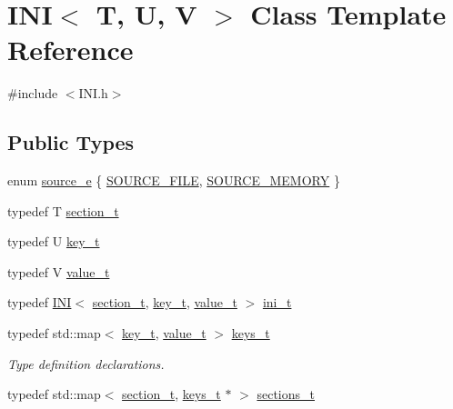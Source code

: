 \hypertarget{class_i_n_i}{}\section{I\+N\+I$<$ T, U, V $>$ Class Template Reference}
\label{class_i_n_i}


{\ttfamily \#include $<$I\+N\+I.\+h$>$}

\subsection*{Public Types}
\begin{DoxyCompactItemize}
\item 
enum \hyperlink{class_i_n_i_a0e7d70a0276fc704cdd427c9b02f7a03}{source\+\_\+e} \{ \hyperlink{class_i_n_i_a0e7d70a0276fc704cdd427c9b02f7a03a0bec937da54b19ad14ecaded8360b65f}{S\+O\+U\+R\+C\+E\+\_\+\+F\+I\+L\+E}, 
\hyperlink{class_i_n_i_a0e7d70a0276fc704cdd427c9b02f7a03aaaa209937bb226994c131a9b35fe0984}{S\+O\+U\+R\+C\+E\+\_\+\+M\+E\+M\+O\+R\+Y}
 \}
\item 
typedef T \hyperlink{class_i_n_i_a82551bff97cdd5c7ff183b24bd9b2188}{section\+\_\+t}
\item 
typedef U \hyperlink{class_i_n_i_acfa659efbac1eb0c62c1a910b0b09541}{key\+\_\+t}
\item 
typedef V \hyperlink{class_i_n_i_aeda858880798b4d54ba09bbd00ee1683}{value\+\_\+t}
\item 
typedef \hyperlink{class_i_n_i}{I\+N\+I}$<$ \hyperlink{class_i_n_i_a82551bff97cdd5c7ff183b24bd9b2188}{section\+\_\+t}, \hyperlink{class_i_n_i_acfa659efbac1eb0c62c1a910b0b09541}{key\+\_\+t}, \hyperlink{class_i_n_i_aeda858880798b4d54ba09bbd00ee1683}{value\+\_\+t} $>$ \hyperlink{class_i_n_i_a510efd26938d16fcaac1b3b8bdd47f34}{ini\+\_\+t}
\item 
typedef std\+::map$<$ \hyperlink{class_i_n_i_acfa659efbac1eb0c62c1a910b0b09541}{key\+\_\+t}, \hyperlink{class_i_n_i_aeda858880798b4d54ba09bbd00ee1683}{value\+\_\+t} $>$ \hyperlink{class_i_n_i_a4254e881abdbf891a408cb032e0d717d}{keys\+\_\+t}
\begin{DoxyCompactList}\small\item\em Type definition declarations. \end{DoxyCompactList}\item 
typedef std\+::map$<$ \hyperlink{class_i_n_i_a82551bff97cdd5c7ff183b24bd9b2188}{section\+\_\+t}, \hyperlink{class_i_n_i_a4254e881abdbf891a408cb032e0d717d}{keys\+\_\+t} $\ast$ $>$ \hyperlink{class_i_n_i_ab5fa6745b8a64763b20964a254469aa2}{sections\+\_\+t}

\end{DoxyCompactItemize}
